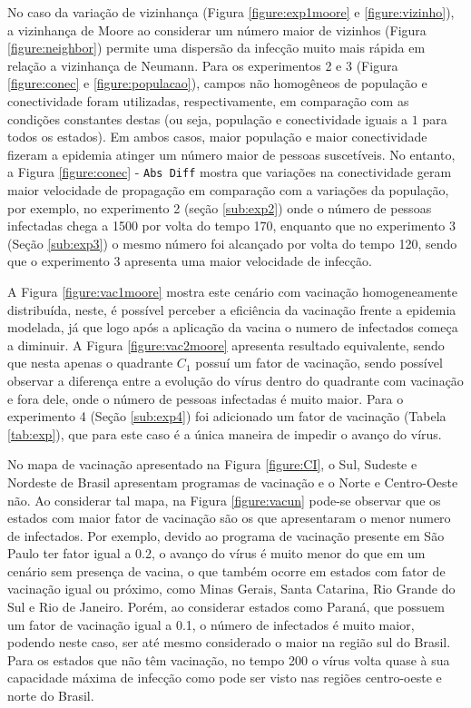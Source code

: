 \documentclass[a4paper,12pt]{article}
\begin{document}
No caso da variação de vizinhança (Figura \ref{figure:exp1moore} e \ref{figure:vizinho}), a vizinhança de Moore ao considerar um número maior de vizinhos (Figura \ref{figure:neighbor}) permite uma dispersão da infecção muito mais rápida em relação a vizinhança de Neumann. Para os experimentos 2 e 3 (Figura \ref{figure:conec} e \ref{figure:populacao}), campos não homogêneos de população e conectividade foram utilizadas, respectivamente, em comparação com as condições constantes destas (ou seja, população e conectividade iguais a $1$ para todos os estados).
Em ambos casos, maior população e maior conectividade fizeram a epidemia atinger um número maior de pessoas suscetíveis. No entanto, a Figura \ref{figure:conec} - \texttt{Abs Diff} mostra que variações na conectividade geram maior velocidade de propagação em comparação com a variações da população, por exemplo, no experimento 2 (seção \ref{sub:exp2}) onde o número de pessoas infectadas chega a 1500 por volta do tempo 170, enquanto que no experimento 3 (Seção \ref{sub:exp3}) o mesmo número foi alcançado por volta do tempo 120, sendo que o experimento 3 apresenta uma maior velocidade de infecção. 

A Figura \ref{figure:vac1moore} mostra este cenário com vacinação homogeneamente distribuída, neste, é possível perceber a eficiência da vacinação frente a epidemia modelada, já que logo após a aplicação da vacina o numero de infectados começa a diminuir. A Figura \ref{figure:vac2moore} apresenta resultado equivalente, sendo que nesta apenas o quadrante $C_1$ possuí um fator de vacinação, sendo possível observar a diferença entre a evolução do vírus dentro do quadrante com vacinação e fora dele, onde o número de pessoas infectadas é muito maior. Para o experimento 4 (Seção \ref{sub:exp4}) foi adicionado um fator de vacinação (Tabela \ref{tab:exp}), que para este caso é a única maneira de impedir o avanço do vírus. 

No mapa de vacinação apresentado na Figura \ref{figure:CI}, o Sul, Sudeste e Nordeste de Brasil apresentam programas de vacinação e o Norte e Centro-Oeste não. Ao considerar tal mapa, na Figura \ref{figure:vacun} pode-se observar que os estados com maior fator de vacinação são os que apresentaram o menor numero de infectados. Por exemplo, devido ao programa de vacinação presente em São Paulo ter fator igual a 0.2, o avanço do vírus é muito menor do que em um cenário sem presença de vacina, o que também ocorre em estados com fator de vacinação igual ou próximo, como Minas Gerais, Santa Catarina, Rio Grande do Sul e Rio de Janeiro. Porém, ao considerar estados como Paraná, que possuem um fator de vacinação igual a 0.1, o número de infectados é muito maior, podendo neste caso, ser até mesmo considerado o maior na região sul do Brasil. Para os estados que não têm vacinação, no tempo 200 o vírus volta quase à sua capacidade máxima de infecção como pode ser visto nas regiões centro-oeste e norte do Brasil.
\end{document}
